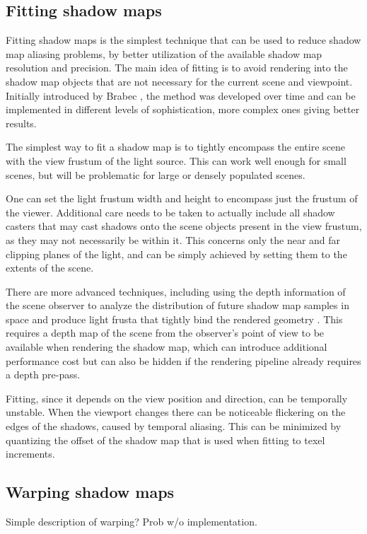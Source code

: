\subsection{Fitting shadow maps}
Fitting shadow maps is the simplest technique that can be used to reduce shadow map aliasing problems, by better utilization of the available shadow map resolution and precision. The main idea of fitting is to avoid rendering into the shadow map objects that are not necessary for the current scene and viewpoint. Initially introduced by Brabec \cite{bib:article:brabec_linear_depth}, the method was developed over time and can be implemented in different levels of sophistication, more complex ones giving better results.

The simplest way to fit a shadow map is to tightly encompass the entire scene with the view frustum of the light source. This can work well enough for small scenes, but will be problematic for large or densely populated scenes.

One can set the light frustum width and height to encompass just the frustum of the viewer. Additional care needs to be taken to actually include all shadow casters that may cast shadows onto the scene objects present in the view frustum, as they may not necessarily be within it. This concerns only the near and far clipping planes of the light, and can be simply achieved by setting them to the extents of the scene.

There are more advanced techniques, including using the depth information of the scene observer to analyze the distribution of future shadow map samples in space and produce light frusta that tightly bind the rendered geometry \cite{bib:proc:luritzen_sample_dist_shadow_maps}. This requires a depth map of the scene from the observer's point of view to be available when rendering the shadow map, which can introduce additional performance cost but can also be hidden if the rendering pipeline already requires a depth pre-pass.

Fitting, since it depends on the view position and direction, can be temporally unstable. When the viewport changes there can be noticeable flickering on the edges of the shadows, caused by temporal aliasing. This can be minimized by quantizing the offset of the shadow map that is used when fitting to texel increments.

\subsection{Warping shadow maps}
Simple description of warping? Prob w/o implementation.

